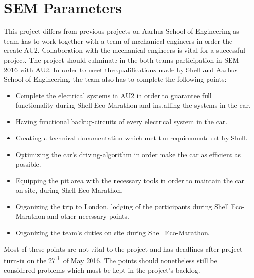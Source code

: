 \section{SEM Parameters }
This project differs from previous projects on Aarhus School of Engineering as team has to work together with a team of mechanical engineers in order the create AU2. Collaboration with the mechanical engineers is vital for a successful project. The project should culminate in the both teams participation in SEM 2016 with AU2. In order to meet the qualifications made by Shell and Aarhus School of Engineering, the team also has to complete the following points:
\begin{itemize}
	\item Complete the electrical systems in AU2 in order to guarantee full functionality during Shell Eco-Marathon and installing the systems in the car.
	\item Having functional backup-circuits of every electrical system in the car.
	\item Creating a technical documentation which met the requirements set by Shell.
	\item Optimizing the car's driving-algorithm in order make the car as efficient as possible.
	\item Equipping the pit area with the necessary tools in order to maintain the car on site, during Shell Eco-Marathon.
	\item Organizing the trip to London, lodging of the participants during Shell Eco-Marathon and other necessary points.
	\item Organizing the team's duties on site during Shell Eco-Marathon.
\end{itemize}
Most of these points are not vital to the project and has deadlines after project turn-in on the 27\textsuperscript{th} of May 2016. The points should nonetheless still be considered problems which must be kept in the project's backlog.